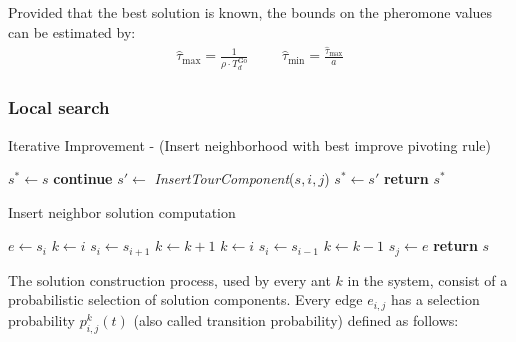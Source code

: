 \begin{homeworkProblem}
Provided that the best solution is known, the bounds on the pheromone values can be estimated by:
\begin{equation}
\begin{array}{lccr}
  \hat{\tau}_{\max} = \frac{1}{\rho \cdot T_{d}^{\text{Go}}} & & & \hat{\tau}_{\min} = \frac{\hat{\tau}_{\max}}{a}
\end{array}
\end{equation}

\subsubsection{Local search}
\begin{algorithm}[!h]
  \caption{Iterative Improvement - (Insert neighborhood with best improve pivoting rule)}\label{locsearch}
  \begin{algorithmic}[1]
      \State $s^{*} \gets s$ 
				    \State \textbf{continue}
			    \EndIf
			    \State $s' \gets$ \emph{InsertTourComponent}($s,i,j$)
          \State $s^{*} \gets s'$
        \EndIf
        \EndFor
      \EndFor
      \State \textbf{return} $s^{*}$
    \EndProcedure
\end{algorithmic}
\end{algorithm}

\begin{algorithm}[!h]
  \caption{Insert neighbor solution computation}\label{locsearch}
  \begin{algorithmic}[1]
      \State {}
      \State $e \gets s_i$
      \State $k \gets i$
				  \State $s_i \gets s_{i+1}$
				  \State $k \gets k+1$
			  \EndWhile
			\Else
			\State $k \gets i$
				  \State $s_i \gets s_{i-1}$
				  \State $k \gets k-1$
			  \EndWhile
			\EndIf
			\State $s_j \gets e$
     \State \textbf{return} $s$
    \EndProcedure
\end{algorithmic}
\end{algorithm}


The solution construction process, used by every ant $k$ in the system, consist of a probabilistic selection of solution components.
Every edge $e_{i,j}$ has a selection probability $p_{i,j}^k(t)$ (also called transition probability) defined as follows:


\end{homeworkProblem}
